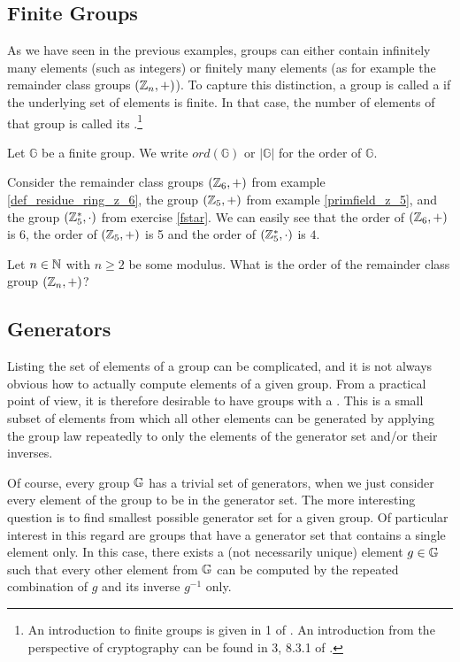 \subsection{Finite Groups}
\label{sec:finite-groups}
 As we have seen in the previous examples, groups can either contain infinitely many elements (such as integers) or finitely many elements (as for example the remainder class groups $(\mathbb{Z}_n,+)$). To capture this distinction, a group is called a  if the underlying set of elements is finite. In that case, the number of elements of that group is called its .\footnote{An introduction to finite groups is given in \chaptname{} 1 of \cite{fuchs-2015}. An introduction from the perspective of cryptography can be found in \chaptname{} 3, \secname{} 8.3.1 of \cite{katz-2007}.}
\begin{notation}
Let $\mathbb{G}$ be a finite group. We write $ord(\mathbb{G})$ or  $|\mathbb{G}|$ for the order of $\mathbb{G}$.
\end{notation}
\begin{example}\label{example:Zn}
Consider the remainder class groups $(\mathbb{Z}_6,+)$ from example \ref{def_residue_ring_z_6}, the group $(\mathbb{Z}_5,+)$ from example \ref{primfield_z_5}, and the group $(\mathbb{Z}_5^*,\cdot)$ from exercise \ref{fstar}. We can easily see that the order of $(\mathbb{Z}_6,+)$ is $6$, the order of $(\mathbb{Z}_5,+)$ is 5 and the order of $(\mathbb{Z}_5^*,\cdot)$ is $4$.
\end{example}
\begin{exercise}
\label{ex:Zn} Let $n\in\mathbb{N}$ with $n\geq 2$ be some modulus. What is the order of the remainder class group $(\mathbb{Z}_n,+)$?
\end{exercise}
\subsection{Generators}\label{generators} Listing the set of elements of a group can be {complicated}, and it is not always obvious how to actually compute elements of a given group. From a practical point of view, it is therefore desirable to have groups with a . This is a small subset of elements from which all other elements can be generated by applying the group law repeatedly to only the elements of the generator set and/or their inverses. 

Of course, every group $\mathbb{G}$ has a trivial set of generators, when we just consider every element of the group to be in the generator set. The more interesting question is to find smallest possible generator set for a given group. Of particular interest in this regard are groups that have a generator set that contains a single element only. In this case, there exists a (not necessarily unique) element $g\in\mathbb{G}$ such that every other element from $\mathbb{G}$ can be computed by the repeated combination of $g$ and its inverse $g^{-1}$ only. 

